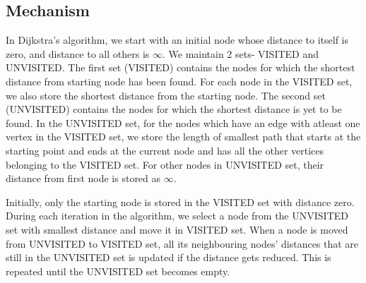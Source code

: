 \documentclass{article}
\begin{document}
\subsection{Mechanism}
In Dijkstra's algorithm, we start with an initial node whose distance to itself is zero, and distance to all others is $\infty$. We maintain 2 sets- VISITED and UNVISITED. The first set (VISITED) contains the nodes for which the shortest distance from starting node has been found. For each node in the VISITED set, we also store the shortest distance from the starting node. The second set (UNVISITED) contains the nodes for which the shortest distance is yet to be found. In the UNVISITED set, for the nodes which have an edge with atleast one vertex in the VISITED set, we store the length of smallest path that starts at the starting point and ends at the current node and has all the other vertices belonging to the VISITED set. For other nodes in UNVISITED set, their distance from first node is stored as $\infty$. 
\\
\par Initially, only the starting node is stored in the VISITED set with distance zero. During each iteration in the algorithm, we select a node from the UNVISITED set with smallest distance and move it in VISITED set. When a node is moved from UNVISITED to VISITED set, all its neighbouring nodes' distances that are still in the UNVISITED set is updated if the distance gets reduced. This is repeated until the UNVISITED set becomes empty.
\end{document}
